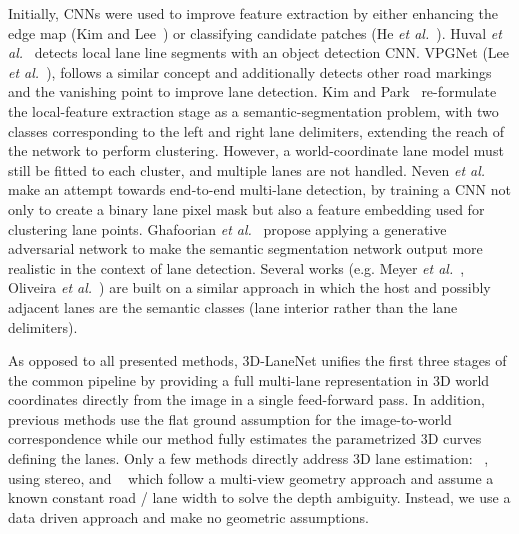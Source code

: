 \documentclass[10pt,twocolumn,letterpaper]{article}
\begin{document}
Initially, CNNs were used to improve feature extraction by either enhancing the edge map (Kim and Lee~\cite{kim_lee}) or classifying candidate patches (He \textit{et al.}~\cite{He}). Huval \textit{et al.}~\cite{huval} detects local lane line segments with an object detection CNN. VPGNet (Lee \textit{et al.}~\cite{lee}), follows a similar concept and additionally detects other road markings and the vanishing point to improve lane detection. Kim and Park~\cite{kim_park} re-formulate the local-feature extraction stage as a semantic-segmentation problem, with two classes corresponding to the left and right lane delimiters, extending the reach of the network to perform clustering. However, a world-coordinate lane model must still be fitted to each cluster, and multiple lanes are not handled. Neven \textit{et al.}~\cite{neven} make an attempt towards end-to-end multi-lane detection, by training a CNN not only to create a binary lane pixel mask but also a feature embedding used for clustering lane points. Ghafoorian \textit{et al.}~\cite{Ghafoorian} propose applying a generative adversarial network to make the semantic segmentation network output more realistic in the context of lane detection. Several works (e.g. Meyer \textit{et al.}~\cite{Meyer}, Oliveira \textit{et al.}~\cite{Oliveira}) are built on a similar approach in which the host and possibly adjacent lanes are the semantic classes (lane interior rather than the lane delimiters).




As opposed to all presented methods, 3D-LaneNet unifies the first three stages of the common pipeline by providing a full multi-lane representation in 3D world coordinates directly from the image in a single feed-forward pass. In addition, previous methods use the flat ground assumption for the image-to-world correspondence while our method fully estimates the parametrized 3D curves defining the lanes. Only a few methods directly address 3D lane estimation: ~\cite{Nedevschi2004}, using stereo, and ~\cite{Xiong2018, Coulombeau_Laurgeau2002} which follow a multi-view geometry approach and assume a known constant road / lane width to solve the depth ambiguity. Instead, we use a data driven approach and make no geometric assumptions.
\end{document}
